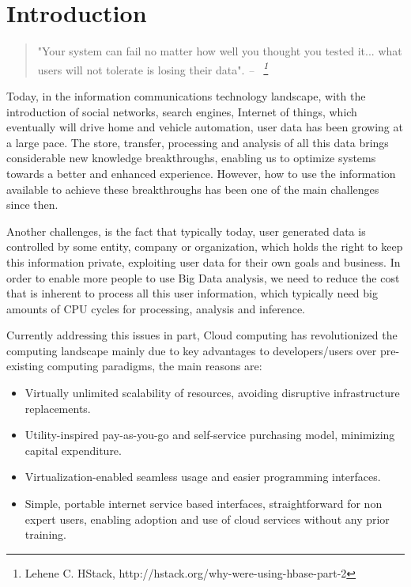 \chapter{Introduction}\label{ch:intro}

\begin{quotation}
"Your system can fail no matter how well you thought you tested it... what users will not tolerate is losing their data".
{\small\it -- ~\footnote{Lehene C. HStack, http://hstack.org/why-were-using-hbase-part-2} }
\end{quotation}

Today, in the information communications technology landscape, with the introduction of social networks, search engines, Internet of things, which eventually will drive home and vehicle automation, user data has been growing at a large pace. The store, transfer, processing and analysis of all this data brings considerable new knowledge breakthroughs, enabling us to optimize systems towards a better and enhanced experience. However, how to use the information available to achieve these breakthroughs has been one of the main challenges since then. 

Another challenges, is the fact that typically today, user generated data is controlled by some entity, company or organization, which holds the right to keep this information private, exploiting user data for their own goals and business. In order to enable more people to use Big Data analysis, we need to reduce the cost that is inherent to process all this user information, which typically need big amounts of CPU cycles for processing, analysis and inference.

Currently addressing this issues in part, Cloud computing has revolutionized the computing landscape mainly due to key advantages to developers/users over pre-existing computing paradigms, the main reasons are:
\begin{itemize}
  \item Virtually unlimited scalability of resources, avoiding disruptive infrastructure replacements.
  \item Utility-inspired pay-as-you-go and self-service purchasing model, minimizing capital expenditure.
  \item Virtualization-enabled seamless usage and easier programming interfaces.
  \item Simple, portable internet service based interfaces, straightforward for non expert users, enabling adoption and use of cloud services without any prior training.
 \end{itemize} 

